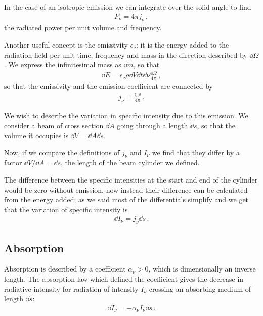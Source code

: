\documentclass[main.tex]{subfiles}
\begin{document}
In the case of an isotropic emission we can integrate over the solid angle to find  
%
\begin{align}
P_{\nu } = 4 \pi j_{\nu }
\,,
\end{align}
%
the radiated power per unit volume and frequency. 

Another useful concept is the emissivity \(\epsilon_{\nu }\): it is the energy added to the radiation field per unit time, frequency and mass in the direction described by \(\dd{\Omega }\). We express the infinitesimal mass as \(\dd{m}\), so that 
%
\begin{align}
\dd{E} = \epsilon_{\nu } \rho \dd{V} \dd{t} \dd{\nu } \frac{ \dd{\Omega }}{4\pi }
\,,
\end{align}
%
so that the emissivity and the emission coefficient are connected by 
%
\begin{align}
j_{\nu } = \frac{\epsilon_{\nu } \rho }{4 \pi }
\,.
\end{align}

We wish to describe the variation in specific intensity due to this emission. 
We consider a beam of cross section \(\dd{A}\) going through a length \(\dd{s}\), so that the volume it occupies is \(\dd{V} = \dd{A} \dd{s}\). 

Now, if we compare the definitions of \(j_{\nu }\) and \(I_{\nu }\) we find that they differ by a factor \(\dd{V} / \dd{A} = \dd{s}\), the length of the beam cylinder we defined. 

The difference between the specific intensities at the start and end of the cylinder would be zero without emission, now instead their difference can be calculated from the energy added; as we said most of the differentials simplify and we get that the variation of specific intensity is
%
\begin{align}
\dd{I_{\nu }} = j_{\nu } \dd{s}
\,.
\end{align}

\subsection{Absorption}

Absorption is described by a coefficient \(\alpha_{\nu }>0\), which is dimensionally an inverse length. 
The absorption law which defined the coefficient gives the decrease in radiative intensity for radiation of intensity \(I_{\nu }\) crossing an absorbing medium of length \(\dd{s}\):
%
\begin{align}
\dd{I_{\nu }} =- \alpha_{\nu } I_{\nu } \dd{s}
\,.
\end{align}
\end{document}
